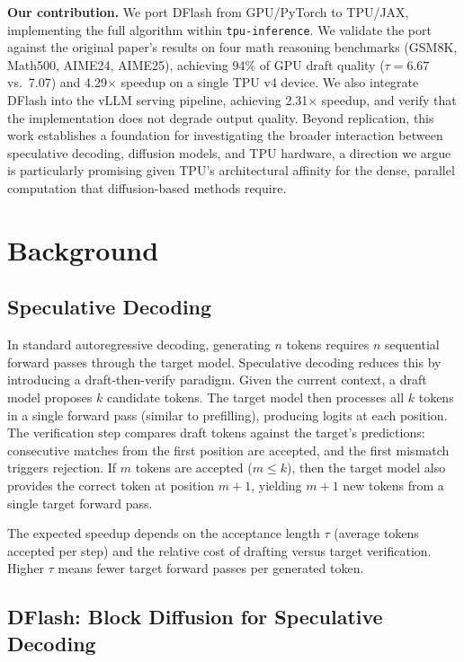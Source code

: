 \documentclass[12pt,letterpaper]{article}
\begin{document}
\textbf{Our contribution.} We port DFlash from GPU/PyTorch to TPU/JAX, implementing the full algorithm within \texttt{tpu-inference}. We validate the port against the original paper's results on four math reasoning benchmarks (GSM8K, Math500, AIME24, AIME25), achieving 94\% of GPU draft quality ($\tau=6.67$ vs.\ 7.07) and 4.29$\times$ speedup on a single TPU v4 device. We also integrate DFlash into the vLLM serving pipeline, achieving 2.31$\times$ speedup, and verify that the implementation does not degrade output quality. Beyond replication, this work establishes a foundation for investigating the broader interaction between speculative decoding, diffusion models, and TPU hardware, a direction we argue is particularly promising given TPU's architectural affinity for the dense, parallel computation that diffusion-based methods require.


\section{Background}

\subsection{Speculative Decoding}

In standard autoregressive decoding, generating $n$ tokens requires $n$ sequential forward passes through the target model. Speculative decoding \citep{leviathan2023fastinferencetransformersspeculative} reduces this by introducing a draft-then-verify paradigm. Given the current context, a draft model proposes $k$ candidate tokens. The target model then processes all $k$ tokens in a single forward pass (similar to prefilling), producing logits at each position. The verification step compares draft tokens against the target's predictions: consecutive matches from the first position are accepted, and the first mismatch triggers rejection. If $m$ tokens are accepted ($m \leq k$), then the target model also provides the correct token at position $m+1$, yielding $m+1$ new tokens from a single target forward pass.

The expected speedup depends on the acceptance length $\tau$ (average tokens accepted per step) and the relative cost of drafting versus target verification. Higher $\tau$ means fewer target forward passes per generated token.

\subsection{DFlash: Block Diffusion for Speculative Decoding}
\end{document}

